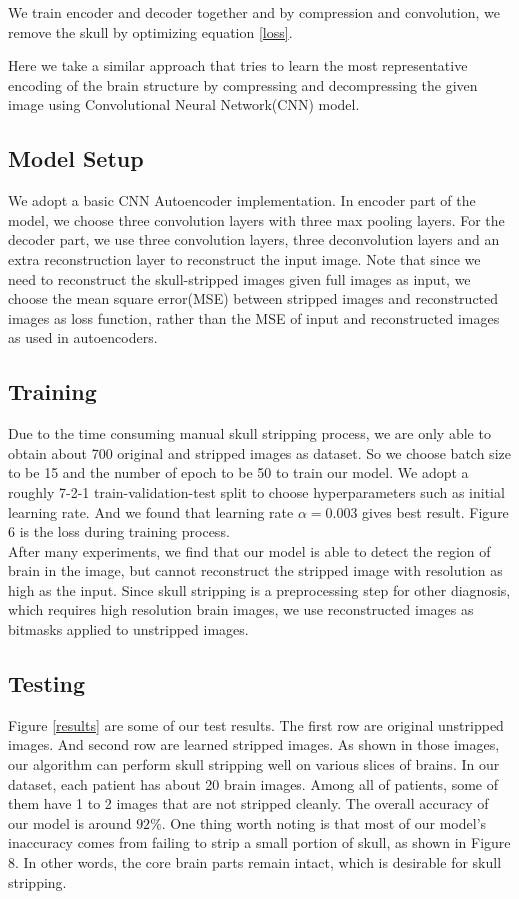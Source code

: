 \documentclass[conference]{IEEEtran}
\begin{document}
We train encoder and decoder together and by compression and convolution, we remove the skull by optimizing equation \ref{loss}. 

Here we take a similar approach that tries to learn the most representative encoding of the brain structure by compressing and decompressing the given image using Convolutional Neural Network(CNN) model. 

\subsection*{Model Setup}
We adopt a basic CNN Autoencoder implementation. In encoder part of the model, we choose three convolution layers with three max pooling layers. For the decoder part, we use three convolution layers, three deconvolution layers and an extra reconstruction layer to reconstruct the input image. Note that since we need to reconstruct the skull-stripped images given full images as input, we choose the mean square error(MSE) between stripped images and reconstructed images as loss function, rather than the MSE of input and reconstructed images as used in autoencoders.
\subsection*{Training}
Due to the time consuming manual skull stripping process, we are only able to obtain about 700 original and stripped images as dataset. So we choose batch size to be 15 and the number of epoch to be 50 to train our model. We adopt a roughly 7-2-1 train-validation-test split to choose hyperparameters such as initial learning rate. And we found that learning rate $\alpha = 0.003$ gives best result. Figure 6 is the loss during training process.\\

After many experiments, we find that our model is able to detect the region of brain in the image, but cannot reconstruct the stripped image with resolution as high as the input. Since skull stripping is a preprocessing step for other diagnosis, which requires high resolution brain images, we use reconstructed images as bitmasks applied to unstripped images.
\subsection*{Testing}

Figure \ref{results} are some of our test results. The first row are original unstripped images. And second row are learned stripped images. As shown in those images, our algorithm can perform skull stripping well on various slices of brains.
In our dataset, each patient has about 20 brain images. Among all of patients, some of them have 1 to 2 images that are not stripped cleanly. The overall accuracy of our model is around $92\%$. One thing worth noting is that most of our model's inaccuracy comes from failing to strip a small portion of skull, as shown in Figure 8. In other words, the core brain parts remain intact, which is desirable for skull stripping.\\
\end{document}

